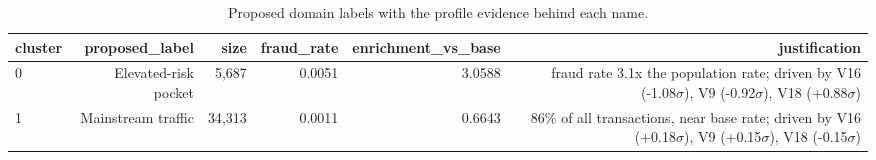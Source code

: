 \begin{table}[htbp]
\centering
\begin{tabular}{lrrrrr}
\toprule
cluster & proposed\_label & size & fraud\_rate & enrichment\_vs\_base & justification \\
\midrule
0 & Elevated-risk pocket & 5{,}687 & 0.0051 & 3.0588 & fraud rate 3.1x the population rate; driven by V16 (-1.08$\sigma$), V9 (-0.92$\sigma$), V18 (+0.88$\sigma$) \\
1 & Mainstream traffic & 34{,}313 & 0.0011 & 0.6643 & 86\% of all transactions, near base rate; driven by V16 (+0.18$\sigma$), V9 (+0.15$\sigma$), V18 (-0.15$\sigma$) \\
\bottomrule
\end{tabular}
\caption{Proposed domain labels with the profile evidence behind each name.}
\label{tab:domain-labels}
\end{table}
